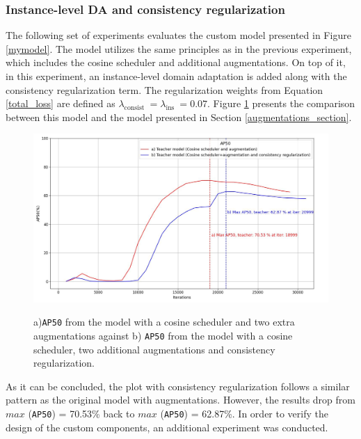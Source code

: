 \subsubsection{Instance-level DA and consistency regularization}
The following set of experiments evaluates the custom model presented in Figure \ref{mymodel}. The model utilizes the same principles as in the previous experiment, which includes the cosine scheduler and additional augmentations. On top of it, in this experiment, an instance-level domain adaptation is added along with the consistency regularization term. The regularization weights from Equation \ref{total_loss} are defined as $\lambda_{\text {consist }} = \lambda_{\text {ins }} = 0.07$. Figure \ref{myModel_experiment} presents the comparison between this model and the model presented in Section \ref{augmentations_section}.

\begin{figure}[htb]
	\begin{center}
		\includegraphics[width=14cm]{./AP50_Augm_consistency.jpg}
	\end{center}
	\caption{a)\texttt{AP50} from the model with a cosine  scheduler and two extra augmentations against b) \texttt{AP50} from the model with a cosine scheduler, two additional augmentations and consistency regularization.}
	\begin{center}
		\label{myModel_experiment}
	\end{center}
\end{figure}
\FloatBarrier  

As it can be concluded, the plot with consistency regularization follows a similar pattern as the original model with augmentations. However, the results drop from $max$ (\texttt{AP50}) = 70.53\% back to  $max$ (\texttt{AP50}) = 62.87\%. In order to verify the design of the custom components, an additional experiment was conducted. 

